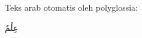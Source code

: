 \documentclass{article}
\begin{document}
Teks arab otomatis oleh polyglossia:

\textarabic{عِلْمٌ}
\end{document}
